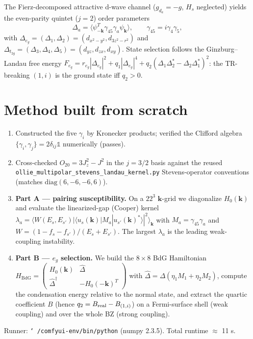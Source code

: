 \documentclass[11pt]{article}
\begin{document}
The Fierz-decomposed attractive d-wave channel ($g_{d_a}=-g$, $H_s$ neglected) yields the
even-parity quintet ($j=2$) order parameters
\begin{equation}
\Delta_a=\langle\psi_{-\mathbf{k}}^T\gamma_{45}\gamma_a\psi_{\mathbf{k}}\rangle,\qquad \gamma_{45}=i\gamma_4\gamma_5,
\end{equation}
with $\Delta_{e_g}=(\Delta_1,\Delta_2)=(d_{x^2-y^2},d_{3z^2-r^2})$ and
$\Delta_{t_{2g}}=(\Delta_3,\Delta_4,\Delta_5)=(d_{yz},d_{zx},d_{xy})$. State selection follows the
Ginzburg--Landau free energy $F_{e_g}=r_{e_g}|\Delta_{e_g}|^2+q_1|\Delta_{e_g}|^4
+q_2(\Delta_1\Delta_2^*-\Delta_2\Delta_1^*)^2$: the TR-breaking $(1,i)$ is the ground state iff $q_2>0$.

\section{Method built from scratch}
\begin{enumerate}
\item Constructed the five $\gamma_i$ by Kronecker products; verified the Clifford algebra
$\{\gamma_i,\gamma_j\}=2\delta_{ij}\mathbb{1}$ numerically (passes).
\item Cross-checked $O_{20}=3J_z^2-J^2$ in the $j=3/2$ basis against the reused
\texttt{ollie\_multipolar\_stevens\_landau\_kernel.py} Stevens-operator conventions (matches
$\mathrm{diag}(6,-6,-6,6)$).
\item \textbf{Part A --- pairing susceptibility.} On a $22^3$ $\mathbf{k}$-grid we diagonalize
$H_0(\mathbf{k})$ and evaluate the linearized-gap (Cooper) kernel
$\lambda_a=\langle W(E_s,E_{s'})|\langle u_s(\mathbf{k})|M_a|u_{s'}(\mathbf{k})^*\rangle|^2\rangle_{\mathbf{k}}$
with $M_a=\gamma_{45}\gamma_a$ and $W=(1-f_s-f_{s'})/(E_s+E_{s'})$. The largest $\lambda_a$ is the
leading weak-coupling instability.
\item \textbf{Part B --- $e_g$ selection.} We build the $8\times8$ BdG Hamiltonian
$H_{\mathrm{BdG}}=\left(\begin{smallmatrix}H_0(\mathbf{k}) & \hat\Delta\\ \hat\Delta^\dagger & -H_0(-\mathbf{k})^T\end{smallmatrix}\right)$
with $\hat\Delta=\Delta(\eta_1 M_1+\eta_2 M_2)$, compute the condensation energy relative to the normal
state, and extract the quartic coefficient $B$ (hence $q_2=B_{\rm real}-B_{(1,i)}$) on a Fermi-surface
shell (weak coupling) and over the whole BZ (strong coupling).
\end{enumerate}
Runner: \texttt{\char`~/comfyui-env/bin/python} (numpy 2.3.5). Total runtime $\approx$ 11 s.
\end{document}
